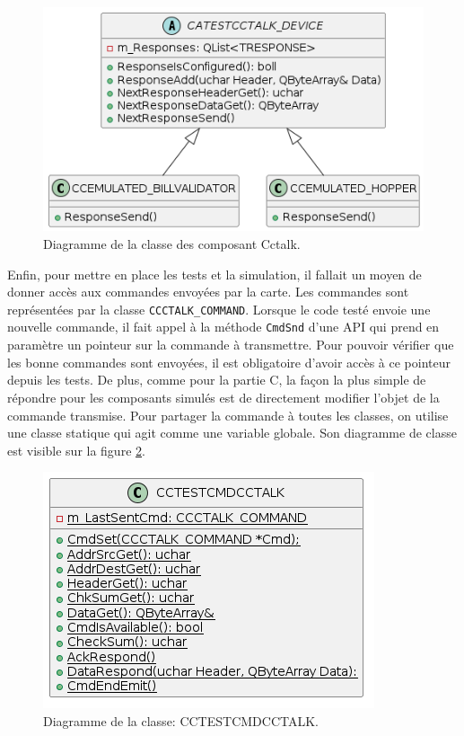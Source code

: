 \documentclass[a4paper]{article}
\begin{document}
\begin{figure}[h!]
  \begin{center}
  \includegraphics[scale=0.5]{./graphs/simulation_cctalk.png}
    \caption{Diagramme de la classe des composant Cctalk.}
    \label{fig:simucctalk}
  \end{center}
\end{figure}

Enfin, pour mettre en place les tests et la simulation, il fallait un moyen de
donner accès aux commandes envoyées par la carte. Les commandes sont
représentées par la classe \verb|CCCTALK_COMMAND|. Lorsque le code testé envoie
une nouvelle commande, il fait appel à la méthode \verb|CmdSnd| d'une API qui
prend en paramètre un pointeur sur la commande à transmettre. Pour pouvoir
vérifier que les bonne commandes sont envoyées, il est obligatoire d'avoir accès
à ce pointeur depuis les tests. De plus, comme pour la partie C, la façon la
plus simple de répondre pour les composants simulés est de directement modifier
l'objet de la commande transmise. Pour partager la commande à toutes les
classes, on utilise une classe statique qui agit comme une variable globale. Son
diagramme de classe est visible sur la figure \ref{fig:testcctalkcmd}.

\begin{figure}[h!]
  \begin{center}
  \includegraphics[scale=0.5]{./graphs/testcctalkcmd.png}
    \caption{Diagramme de la classe: CCTESTCMDCCTALK.}
    \label{fig:testcctalkcmd}
  \end{center}
\end{figure}
\end{document}
